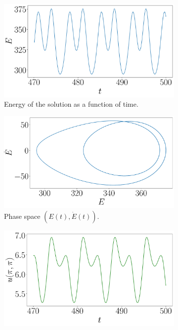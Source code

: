 \documentclass[twoside]{article}
\begin{document}
\begin{figure}
  \centering
  \begin{subfigure}[ht]{0.32\textwidth}
    \includegraphics[width=\textwidth]{images/tp_energy.pdf}
    \caption{Energy of the solution as a function of time.}
  \end{subfigure}\hfill
  \begin{subfigure}[ht]{0.32\textwidth}
    \includegraphics[width=\textwidth]{images/tp_energy_phase.pdf}
    \caption{Phase space $(E(t), \dot{E}(t))$.}
    \label{fig:tp_energy_phase}
  \end{subfigure}\hfill
  \begin{subfigure}[ht]{0.32\textwidth}
    \includegraphics[width=\textwidth]{images/tp_u_pi_pi.pdf}

\end{subfigure}
\end{figure}
\end{document}
